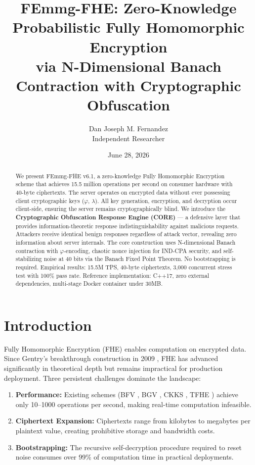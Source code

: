 \documentclass{article}
\title{FEmmg-FHE: Zero-Knowledge Probabilistic Fully Homomorphic Encryption\\via N-Dimensional Banach Contraction with Cryptographic Obfuscation}
\author{Dan Joseph M. Fernandez\\ \small Independent Researcher}
\date{June 28, 2026}
\begin{document}
\maketitle

\begin{abstract}
We present FEmmg-FHE v6.1, a zero-knowledge Fully Homomorphic Encryption scheme that achieves 15.5 million operations per second on consumer hardware with 40-byte ciphertexts. The server operates on encrypted data without ever possessing client cryptographic keys ($\varphi$, $\lambda$). All key generation, encryption, and decryption occur client-side, ensuring the server remains cryptographically blind. We introduce the \textbf{Cryptographic Obfuscation Response Engine (CORE)} — a defensive layer that provides information-theoretic response indistinguishability against malicious requests. Attackers receive identical benign responses regardless of attack vector, revealing zero information about server internals. The core construction uses N-dimensional Banach contraction with $\varphi$-encoding, chaotic nonce injection for IND-CPA security, and self-stabilizing noise at 40 bits via the Banach Fixed Point Theorem. No bootstrapping is required. Empirical results: 15.5M TPS, 40-byte ciphertexts, 3,000 concurrent stress test with 100\% pass rate. Reference implementation: C++17, zero external dependencies, multi-stage Docker container under 30MB.
\end{abstract}

\section{Introduction}

Fully Homomorphic Encryption (FHE) enables computation on encrypted data. Since Gentry's breakthrough construction in 2009 \cite{gentry2009}, FHE has advanced significantly in theoretical depth but remains impractical for production deployment. Three persistent challenges dominate the landscape:

\begin{enumerate}
    \item \textbf{Performance:} Existing schemes (BFV \cite{fan2012}, BGV \cite{brakerski2014}, CKKS \cite{cheon2017}, TFHE \cite{chillotti2020}) achieve only 10--1000 operations per second, making real-time computation infeasible.
    \item \textbf{Ciphertext Expansion:} Ciphertexts range from kilobytes to megabytes per plaintext value, creating prohibitive storage and bandwidth costs.
    \item \textbf{Bootstrapping:} The recursive self-decryption procedure required to reset noise consumes over 99\% of computation time in practical deployments.
\end{enumerate}
\end{document}
